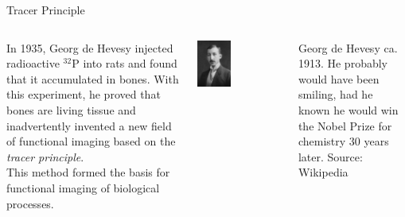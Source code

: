 \begin{frame}[c]{Tracer Principle}
    \begin{columns}[T]
        In 1935, Georg de Hevesy injected radioactive $^{32}$P into rats and found that it accumulated in bones. With this experiment, he proved that bones are living tissue and inadvertently invented a new field of functional imaging based on the \emph{tracer principle}.  \\[0.5cm]
        This method formed the basis for functional imaging of biological processes.

        \begin{centering}
            \includegraphics[width=0.4\textwidth]{images/deHevesy}\\
        \end{centering}
        {\scriptsize Georg de Hevesy ca. 1913. He probably would have been smiling, had he known he would win the Nobel Prize for chemistry $30$ years later. Source: Wikipedia}

    \end{columns}
\end{frame}



